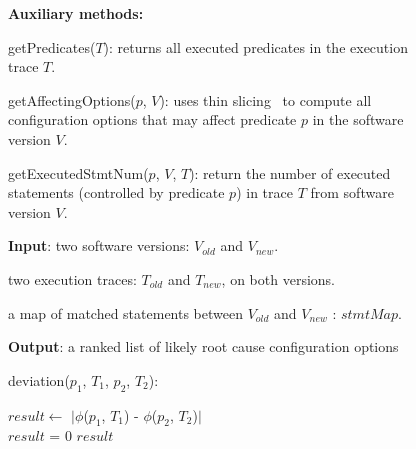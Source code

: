 
\begin{figure}[t]
\textbf{Auxiliary methods:}

\quad getPredicates($\mathit{T}$): returns all executed predicates in the execution trace $\mathit{T}$.

\quad getAffectingOptions($\mathit{p}$, $\mathit{V}$): uses thin slicing~\cite{Sridharan:2007} to compute all configuration options that may affect predicate $\mathit{p}$ in the software version $\mathit{V}$. 

\quad getExecutedStmtNum($\mathit{p}$, $\mathit{V}$, $\mathit{T}$): return the number of executed statements (controlled by predicate $\mathit{p}$) in trace $\mathit{T}$ from software version $\mathit{V}$.

\textbf{Input}: two software versions: $\mathit{V_{old}}$ and $\mathit{V_{new}}$. 

\quad two execution traces: $\mathit{T_{old}}$ and $\mathit{T_{new}}$, on both versions.

\quad a map of matched statements between $\mathit{V_{old}}$ and $\mathit{V_{new}}$ : $\mathit{stmtMap}$.

\textbf{Output}: {a ranked list of likely root cause configuration options}

\vspace{1mm}

deviation($\mathit{p_{1}}$, $\mathit{T_1}$, $\mathit{p_{2}}$, $\mathit{T_2}$):\\
\vspace{-4mm}%
\begin{algorithmic}[1]
\STATE $\mathit{result} \leftarrow$ $|$$\phi$($\mathit{p_{1}}$, $\mathit{T_1}$) - $\phi$($\mathit{p_{2}}$, $\mathit{T_2}$)$|$\\
\STATE $\mathit{result}$ = 0
\ENDIF
\RETURN $\mathit{result}$
\end{algorithmic}


\end{figure}
